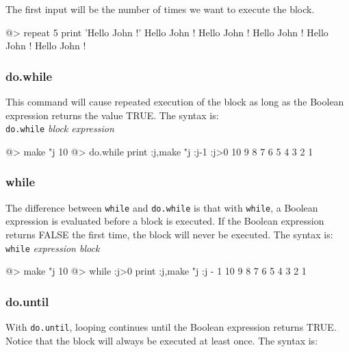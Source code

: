 The first input will be the number of times we want to execute the block.\\

\begin{verbatimtab} 
@> repeat 5 {print 'Hello John !'}
Hello John !
Hello John ! 
Hello John ! 
Hello John ! 
Hello John ! 
\end{verbatimtab}
 
\subsubsection*{do.while} 
 
This command will cause repeated execution of the block as long as the
Boolean expression returns the value TRUE. The syntax is:\\
 
{\tt do.while}  {\it block expression}\\

\begin{verbatimtab} 
@> make "j 10 
@> do.while {print :j,make "j :j-1} :j>0 
10
9
8
7
6
5
4
3
2
1	
\end{verbatimtab}
 
\subsubsection*{while} 

The difference between {\tt while} and {\tt do.while} is that with {\tt while}, a Boolean
expression is evaluated before a block is executed.  If the Boolean
expression returns FALSE the first time, the block will never be
executed. The syntax is:\\

{\tt while}  {\it expression block} \\ 
 
\begin{verbatimtab} 
@> make "j 10 
@> while :j>0 {print :j,make "j :j - 1} 
10
9
8
7
6
5
4
3
2
1	
\end{verbatimtab}
 
\subsubsection*{do.until} 
 
With {\tt do.until}, looping continues until the Boolean expression returns TRUE.
Notice that the block will always be executed at least once. The syntax is: \\
 
